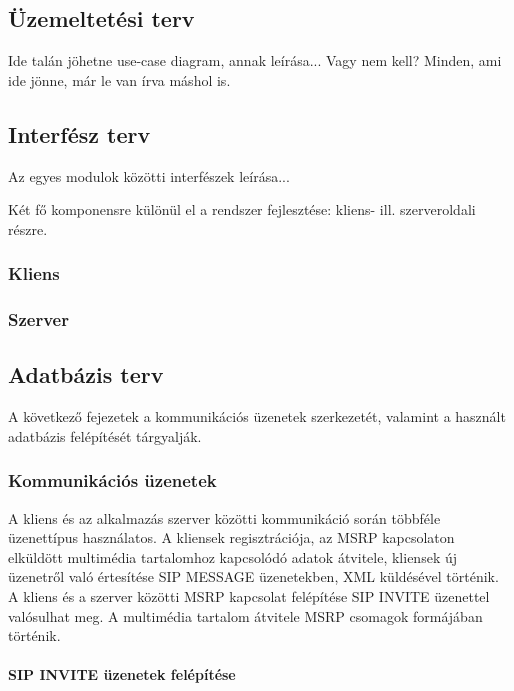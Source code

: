 \subsection{Üzemeltetési terv}
\label{sec:uzemeltetesi_terv}

Ide talán jöhetne use-case diagram, annak leírása... Vagy nem kell? Minden, ami ide jönne, már le van írva máshol is. 

\subsection{Interfész terv}
\label{sec:interfesz_terv}

Az egyes modulok közötti interfészek leírása...

Két fő komponensre különül el a rendszer fejlesztése: kliens-
ill. szerveroldali részre.

\subsubsection{Kliens}
\label{sec:kliensinterfesz}

\subsubsection{Szerver}
\label{sec:szerverinterfesz}

\subsection{Adatbázis terv}

A következő fejezetek a kommunikációs üzenetek szerkezetét, valamint a használt adatbázis felépítését tárgyalják.

\subsubsection{Kommunikációs üzenetek}
\label{sec:komm_uzenetek}

A kliens és az alkalmazás szerver közötti kommunikáció során többféle üzenettípus használatos. A kliensek regisztrációja, az MSRP kapcsolaton elküldött multimédia tartalomhoz kapcsolódó adatok átvitele, kliensek új üzenetről való értesítése SIP MESSAGE üzenetekben, XML küldésével történik. A kliens és a szerver közötti MSRP kapcsolat felépítése SIP INVITE üzenettel valósulhat meg. A multimédia tartalom átvitele MSRP csomagok formájában történik. 

\paragraph{SIP INVITE üzenetek felépítése\\}
\label{sec:sip_invite}

